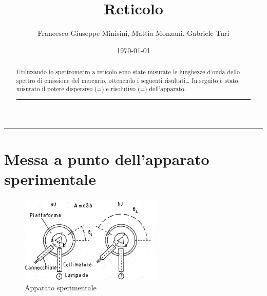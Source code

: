 \documentclass[a4paper,12pt]{article}
\title{Reticolo}
\author{Francesco Giuseppe Minisini, Mattia Monzani, Gabriele Turi}
\date{\today}
\begin{document}
\maketitle
\hrule
\vspace{9pt}
\begin{abstract}
    \noindent
    Utilizzando lo spettrometro a reticolo sono state misurate le lunghezze d’onda dello spettro di emissione del mercurio, ottenendo i seguenti risultati… 
    In seguito è stato misurato il potere dispersivo (=) e risolutivo (=) dell’apparato. 
\vspace{20 pt}
\hrule
\end{abstract}
\vspace{2 pt}


\section{Messa a punto dell'apparato sperimentale}

\begin{figure}[H]
    \centering
    \includegraphics[width=0.6\textwidth]{image.png}
    \caption{Apparato sperimentale}
    \label{fig:camera_millikan}
\end{figure}
\end{document}
